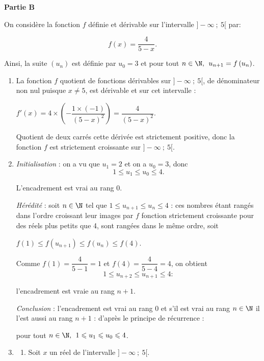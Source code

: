 \medskip

\textbf{Partie B}

\medskip

On considère la fonction $f$ définie et dérivable sur l'intervalle $] -\infty~;~5[$ par:

\[f(x) = \dfrac{4}{5 - x}.\]

Ainsi, la suite $\left(u_n\right)$ est définie par $u_0 = 3$ et pour tout $n \in \N,\:\: u_{n+1}  = f\left(u_n\right)$.

\medskip

\begin{enumerate}
\item %
La fonction $f$ quotient de fonctions dérivables sur $]-\infty~;~5[$, de dénominateur non nul puisque $x \ne 5$, est dérivable et sur cet intervalle :

$f'(x) = 4 \times \left(- \dfrac{1 \times (-1)}{(5 - x)^2}\right) = \dfrac{4}{(5 - x)^2}$.

Quotient de deux carrés cette dérivée est strictement positive, donc la fonction $f$ est strictement croissante sur $]-\infty~;~5[$.
\item %
\emph{Initialisation} : on a vu que $u_1 = 2$ et on a $u_0 = 3$, donc 
\[1 \leqslant u_{1} \leqslant u_0 \leqslant 4.\]

L'encadrement est vrai au rang 0.

\emph{Hérédité} : soit $n \in \N$ tel que $1 \leqslant u_{n+1} \leqslant u_n \leqslant 4$ : ces nombres étant rangés dans l'ordre croissant leur images par $f$ fonction strictement croissante  pour des réels plus petits que 4, sont rangées dans le même ordre, soit 

$f(1) \leqslant f\left(u_{n+1}\right) \leqslant f\left(u_{n}\right) \leqslant f(4)$.

Comme $f(1) = \dfrac{4}{5 - 1} = 1$ et $f(4) = \dfrac{4}{5 - 4} = 4$, on obtient 
\[1 \leqslant u_{n+2} \leqslant u_{n+1} \leqslant 4 :\]

l'encadrement est vraie au rang $n + 1$.

\emph{Conclusion} : l'encadrement est vrai au rang 0 et s'il est vrai au rang $n \in \N$ il l'est aussi au rang $n + 1$ : d'après le principe de récurrence :

pour tout $n \in \N, \: \: 1 \leqslant u_{1} \leqslant u_0 \leqslant 4$.
\item 
	\begin{enumerate}
		\item Soit $x$ un réel de l'intervalle $]-\infty~;~5[$.


\end{enumerate}
\end{enumerate}
